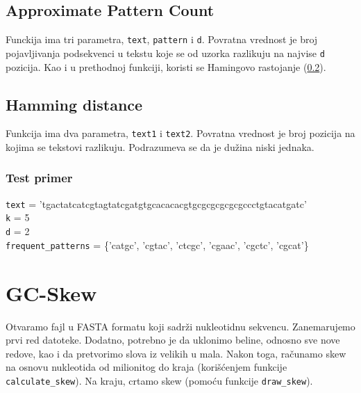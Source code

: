 


\subsection{Approximate Pattern Count}
\label{approximatePatternCount}

Funckija ima tri parametra, \texttt{text}, \texttt{pattern} i \texttt{d}. Povratna vrednost je broj pojavljivanja podsekvenci u tekstu koje se od uzorka razlikuju na najvise \texttt{d} pozicija. Kao i u prethodnoj funkciji, koristi se Hamingovo rastojanje (\ref{hammingDistance}).




\subsection{Hamming distance}
\label{hammingDistance}

Funkcija ima dva parametra, \texttt{text1} i \texttt{text2}. Povratna vrednost je broj pozicija na kojima se tekstovi razlikuju. Podrazumeva se da je dužina niski jednaka. 





\subsubsection{Test primer}
\noindent\texttt{text} = 'tgactatcatcgtagtatcgatgtgcacacacgtgcgcgcgcgcgccctgtacatgatc' 
\\\texttt{k} = 5
\\\texttt{d} = 2
\\\texttt{frequent\_patterns} = \{'catgc', 'cgtac', 'ctcgc', 'cgaac', 'cgctc', 'cgcat'\}


\section{GC-Skew}

Otvaramo fajl u FASTA formatu koji sadrži nukleotidnu sekvencu. Zanemarujemo prvi red datoteke. Dodatno, potrebno je da uklonimo beline, odnosno sve nove redove, kao i da pretvorimo slova iz velikih u mala. Nakon toga, računamo skew na osnovu nukleotida od milionitog do kraja (korišćenjem funkcije \texttt{calculate\_skew}). Na kraju, crtamo skew (pomoću funkcije \texttt{draw\_skew}).

